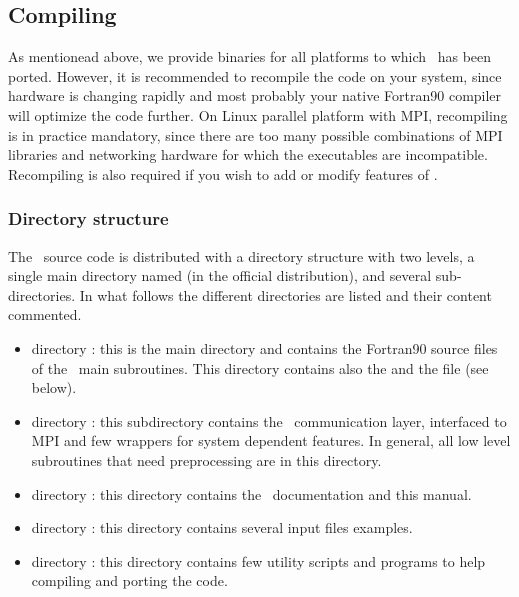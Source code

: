 \subsection{Compiling \PDAC}

As mentionead above, we provide binaries for all
platforms to which \PDAC\ has been ported. However, it is 
recommended to recompile the code on your system, 
since hardware is changing rapidly and most probably 
your native Fortran90 compiler will optimize
the code further. 
On Linux parallel platform with MPI, recompiling 
is in practice mandatory, since there are too
many possible combinations of MPI libraries and networking
hardware for which the executables are incompatible.
Recompiling is also required if you wish  
to add or modify features of \PDAC.

\subsubsection{Directory structure}

The \PDAC\ source code is distributed with a 
directory structure with two levels, a single
main directory named  (in the official distribution), 
and several sub-directories.
In what follows the different directories are listed
and their content commented.

\begin{itemize}

\item directory : 
      this is the main directory and contains the Fortran90 source files
      of the \PDAC\ main subroutines. This directory contains also the 
       and the  file (see below).

\item directory :
      this subdirectory contains the \PDAC\ communication layer,
      interfaced to MPI and few wrappers for system dependent
      features. In general, all low level subroutines that 
      need preprocessing are in this directory.

\item directory :
      this directory contains the \PDAC\ documentation and this manual.

\item directory :
      this directory contains several input files examples.
      
\item directory :
      this directory contains few utility scripts and programs
      to help compiling and porting the code.

\end{itemize}

